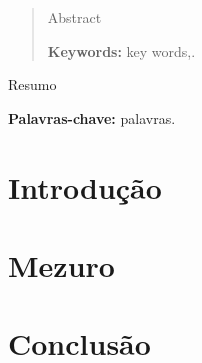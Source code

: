 \documentclass[12pt]{article}
\begin{document}
\sloppy
\title{}

\author{Autor1, Autor2}

\address{
\nextinstitute
  Faculdade de Engenharia -- UnB Gama (FGA)\\
  Gama -- DF -- Brasil
  \email{}
  \email{}
}

\maketitle
\begin{abstract}
  Abstract

\textbf{Keywords:} key words,.
\\
\end{abstract}

\begin{resumo}
  Resumo

\textbf{Palavras-chave:} palavras.
\end{resumo}


\section{Introdução} \label{sec:intro}

\section{Mezuro}

\section{Conclusão}



\end{document}
